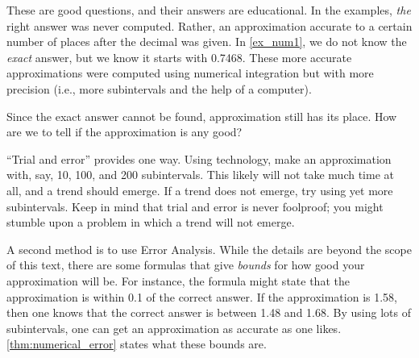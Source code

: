 These are good questions, and their answers are educational. In the examples, \emph{the} right answer was never computed. Rather, an approximation accurate to a certain number of places after the decimal was given. In \autoref{ex_num1}, we do not know the \emph{exact} answer, but we know it starts with 0.7468. These more accurate approximations were computed using numerical integration but with more precision (i.e., more subintervals and the help of a computer). 

Since the exact answer cannot be found, approximation still has its place. How are we to tell if the approximation is any good?

``Trial and error'' provides one way. %
Using technology, make an approximation with, say, 10, 100, and 200 subintervals. This likely will not take much time at all, and a trend should emerge. If a trend does not emerge, try using yet more subintervals. Keep in mind that trial and error is never foolproof; you might stumble upon a problem in which a trend will not emerge.

A second method is to use Error Analysis. While the details are beyond the scope of this text, there are some formulas that give \emph{bounds} for how good your approximation will be. For instance, the formula might state that the approximation is within 0.1 of the correct answer. If the approximation is 1.58, then one knows that the correct answer is between 1.48 and 1.68. By using lots of subintervals, one can get an approximation as accurate as one likes. \autoref{thm:numerical_error} states what these bounds are.

